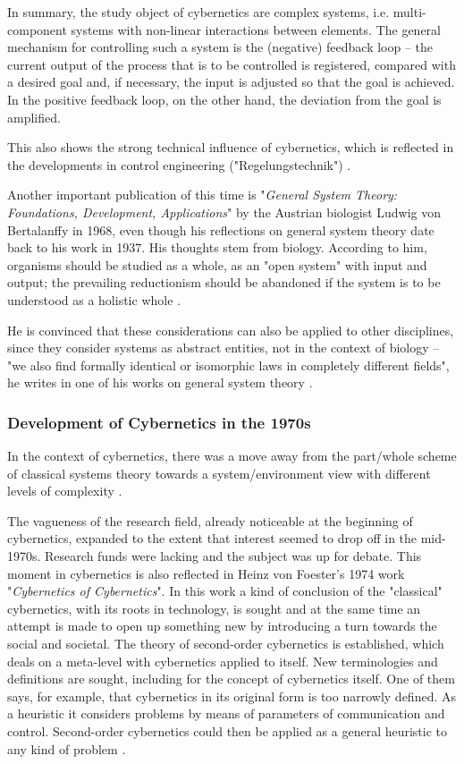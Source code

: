 \documentclass[a4paper,12pt]{article}
\begin{document}
In summary, the study object of cybernetics are complex systems, i.e.
multi-component systems with non-linear interactions between elements. The
general mechanism for controlling such a system is the (negative) feedback
loop -- the current output of the process that is to be controlled is
registered, compared with a desired goal and, if necessary, the input is
adjusted so that the goal is achieved. In the positive feedback loop, on the
other hand, the deviation from the goal is amplified.

This also shows the strong technical influence of cybernetics, which is
reflected in the developments in control engineering ("Regelungstechnik")
\cite{jackson:2003}.

Another important publication of this time is "\textit{General System Theory:
  Foundations, Development, Applications}" by the Austrian biologist Ludwig
von Bertalanffy in 1968, even though his reflections on general system theory
date back to his work in 1937.  His thoughts stem from biology. According to
him, organisms should be studied as a whole, as an "open system" with input
and output; the prevailing reductionism should be abandoned if the system is
to be understood as a holistic whole \cite{jackson:1991}.

He is convinced that these considerations can also be applied to other
disciplines, since they consider systems as abstract entities, not in the
context of biology -- "we also find formally identical or isomorphic laws in
completely different fields", he writes in one of his works on general system
theory \cite{bertalanffy:1950}. 

\subsubsection{Development of Cybernetics in the 1970s}
In the context of cybernetics, there was a move away from the part/whole
scheme of classical systems theory towards a system/environment view with
different levels of complexity \cite{kneer:2009}. 

The vagueness of the research field, already noticeable at the beginning of
cybernetics, expanded to the extent that interest seemed to drop off in the
mid-1970s. Research funds were lacking and the subject was up for debate. This
moment in cybernetics is also reflected in Heinz von Foester's 1974 work
"\textit{Cybernetics of Cybernetics}". In this work a kind of conclusion of
the "classical" cybernetics, with its roots in technology, is sought and at
the same time an attempt is made to open up something new by introducing a
turn towards the social and societal. The theory of second-order cybernetics
is established, which deals on a meta-level with cybernetics applied to
itself. New terminologies and definitions are sought, including for the
concept of cybernetics itself. One of them says, for example, that cybernetics
in its original form is too narrowly defined. As a heuristic it considers
problems by means of parameters of communication and control. Second-order
cybernetics could then be applied as a general heuristic to any kind of
problem \cite{mueller:2008}.
\end{document}
